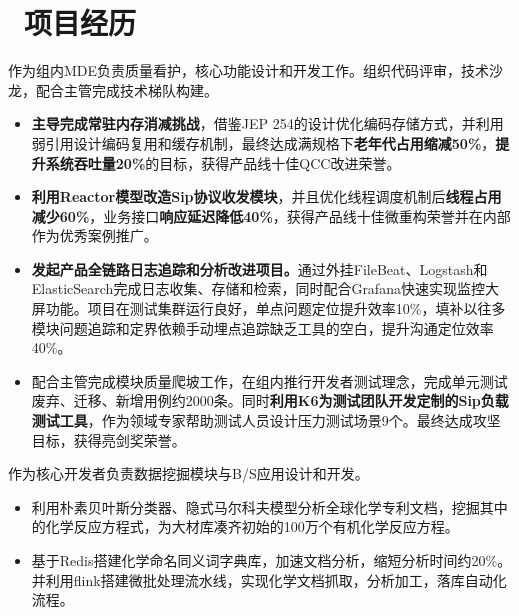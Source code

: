 \documentclass{resume}
\begin{document}



\section{\faBriefcase\ 项目经历}

\begin{onehalfspacing}
作为组内MDE负责质量看护，核心功能设计和开发工作。组织代码评审，技术沙龙，配合主管完成技术梯队构建。
\begin{itemize}
  \item \textbf{主导完成常驻内存消减挑战}，借鉴JEP 254的设计优化编码存储方式，并利用弱引用设计编码复用和缓存机制，最终达成满规格下\textbf{老年代占用缩减50\%}，\textbf{提升系统吞吐量20\%}的目标，获得产品线十佳QCC改进荣誉。
  \item \textbf{利用Reactor模型改造Sip协议收发模块}，并且优化线程调度机制后\textbf{线程占用减少60\%}，业务接口\textbf{响应延迟降低40\%}，获得产品线十佳微重构荣誉并在内部作为优秀案例推广。
  \item \textbf{发起产品全链路日志追踪和分析改进项目。}通过外挂FileBeat、Logstash和ElasticSearch完成日志收集、存储和检索，同时配合Grafana快速实现监控大屏功能。项目在测试集群运行良好，单点问题定位提升效率10\%，填补以往多模块问题追踪和定界依赖手动埋点追踪缺乏工具的空白，提升沟通定位效率40\%。
  \item 配合主管完成模块质量爬坡工作，在组内推行开发者测试理念，完成单元测试废弃、迁移、新增用例约2000条。同时\textbf{利用K6为测试团队开发定制的Sip负载测试工具}，作为领域专家帮助测试人员设计压力测试场景9个。最终达成攻坚目标，获得亮剑奖荣誉。
\end{itemize}
\end{onehalfspacing}

\begin{onehalfspacing}
作为核心开发者负责数据挖掘模块与B/S应用设计和开发。
\begin{itemize}
  \item 利用朴素贝叶斯分类器、隐式马尔科夫模型分析全球化学专利文档，挖掘其中的化学反应方程式，为大材库凑齐初始的100万个有机化学反应方程。
  \item 基于Redis搭建化学命名同义词字典库，加速文档分析，缩短分析时间约20\%。并利用flink搭建微批处理流水线，实现化学文档抓取，分析加工，落库自动化流程。
\end{itemize}
\end{onehalfspacing}
\end{document}

